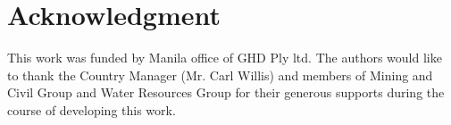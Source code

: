 \documentclass[10pt,halfline,a4paper]{ouparticle}
\begin{document}
\section*{Acknowledgment}
This work was funded by Manila office of GHD Ply ltd. The authors would like to thank the Country Manager (Mr. Carl Willis) and members of Mining and Civil Group and Water Resources Group for their generous supports during the course of developing this work.

\label{sec7}


\end{document}
